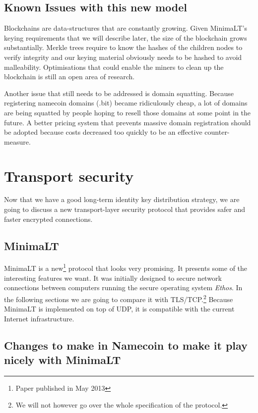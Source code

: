 \documentclass{vldb}
\begin{document}
\subsection{Known Issues with this new model}

Blockchains are data-structures that are constantly growing. Given MinimaLT's keying requirements that we will describe later, the size of the blockchain grows substantially. Merkle trees require to know the hashes of the children nodes to verify integrity and our keying material obviously needs to be hashed to avoid malleability. Optimisations that could enable the miners to clean up the blockchain is still an open area of research.

Another issue that still needs to be addressed is domain squatting\cite{domainSquatting}. Because registering namecoin domains (.bit) became ridiculously cheap, a lot of domains are being squatted by people hoping to resell those domains at some point in the future. A better pricing system that prevents massive domain registration should be adopted because costs decreased too quickly to be an effective counter-measure.

\section{Transport security}

Now that we have a good long-term identity key distribution strategy, we are going to discuss a new transport-layer security protocol that provides safer and faster encrypted connections.
\subsection{MinimaLT}
MinimaLT\cite{MinimaLT} is a new\footnote{Paper published in May 2013} protocol that looks very promising.
It presents some of the interesting features we want. It was initially designed to secure network connections between computers running the secure operating system \emph{Ethos}. In the following sections we are going to compare it with TLS/TCP.\footnote{We will not however go over the whole specification of the protocol.}  Because MinimaLT is implemented on top of UDP, it is compatible with the current Internet infrastructure.

\subsection{Changes to make in Namecoin to make it play nicely with MinimaLT}
\end{document}
